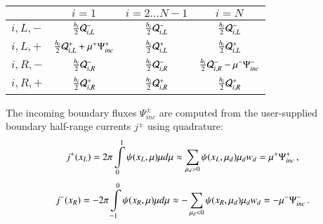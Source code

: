 \documentclass[preprint,12pt]{elsarticle}
\begin{document}
\begin{center}
\begin{tabular}{|l||c|c|c|}\hline
          & $i=1$ & $i=2\ldots N-1$ & $i=N$\\\hline\hline
  $i,L,-$ & $\frac{h_i}{2}\mathcal{Q}^-_{i,L}$
          & $\frac{h_i}{2}\mathcal{Q}^-_{i,L}$
          & $\frac{h_i}{2}\mathcal{Q}^-_{i,L}$ \\\hline
  $i,L,+$ & $\frac{h_i}{2}\mathcal{Q}^+_{i,L} + \mu^+\Psi^+_{inc}$
          & $\frac{h_i}{2}\mathcal{Q}^+_{i,L}$
          & $\frac{h_i}{2}\mathcal{Q}^+_{i,L}$ \\\hline
  $i,R,-$ & $\frac{h_i}{2}\mathcal{Q}^-_{i,R}$
          & $\frac{h_i}{2}\mathcal{Q}^-_{i,R}$
          & $\frac{h_i}{2}\mathcal{Q}^-_{i,R} - \mu^-\Psi^-_{inc}$ \\\hline
  $i,R,+$ & $\frac{h_i}{2}\mathcal{Q}^+_{i,R}$
          & $\frac{h_i}{2}\mathcal{Q}^+_{i,R}$
          & $\frac{h_i}{2}\mathcal{Q}^+_{i,R}$ \\\hline
\end{tabular}
\end{center}
The incoming boundary fluxes $\Psi^\pm_{inc}$ are computed from the
user-supplied boundary half-range currents $j^\pm$ using quadrature:
\begin{equation}
   j^+(x_L) = 2\pi\int\limits_0^1 \psi(x_L,\mu)\mu d\mu
   \approx \sum\limits_{\mu_d>0}\psi(x_L,\mu_d)\mu_d w_d
   = \mu^+\Psi^+_{inc} \, ,
\end{equation}
\begin{equation}
   j^-(x_R) = -2\pi\int\limits_{-1}^0 \psi(x_R,\mu)\mu d\mu
   \approx -\sum\limits_{\mu_d<0}\psi(x_R,\mu_d)\mu_d w_d
   = -\mu^-\Psi^-_{inc} \, .
\end{equation}
\end{document}
